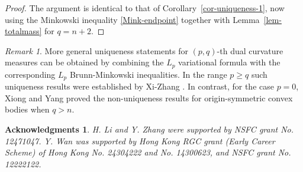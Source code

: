 \documentclass[12pt,leqno]{amsart}
\theoremstyle{plain} \newtheorem{thm}{Theorem}[section]
\theoremstyle{plain} \newtheorem{prop}[thm]{Proposition}
\theoremstyle{plain} \newtheorem{prob}[thm]{Problem}
\theoremstyle{definition} \newtheorem{defi}[thm]{Definition}
\theoremstyle{plain} \newtheorem{cor}[thm]{Corollary}
\theoremstyle{plain} \newtheorem{lem}[thm]{Lemma}
\theoremstyle{plain} \newtheorem{eg}{Example}[section]
\theoremstyle{remark} \newtheorem{rmk}[thm]{Remark}
\theoremstyle{plain} \newtheorem{conj}{Conjecture}
\newtheorem*{ack}{Acknowledgments}
\numberwithin{equation}{section}
\begin{document}
\begin{proof}
  The argument is identical to that of
  Corollary~\ref{cor-uniqueness-1}, now using the Minkowski inequality
  \eqref{Mink-endpoint} together with Lemma~\ref{lem-totalmass} for $q=n+2$.
\end{proof}

\begin{rmk}
  More general uniqueness statements for $(p,q)$-th dual curvature measures can be obtained by combining the $L_p$ variational formula
  with the corresponding $L_p$ Brunn-Minkowski inequalities.  In the range $p\ge q$ such uniqueness results were established by Xi-Zhang \cite{XZ22}.  
  In contrast, for the case $p=0$, Xiong and Yang
  \cite[Theorem~1.2]{XiongY26} proved the non-uniqueness results for origin-symmetric convex bodies when $q>n$.
\end{rmk}

\begin{ack}
	  H. Li and Y. Zhang were supported by NSFC grant No. 12471047.
    Y. Wan was supported by Hong Kong RGC grant (Early Career Scheme) of Hong Kong No. 24304222 and No. 14300623, and NSFC grant No. 12222122.
\end{ack}
\end{document}
